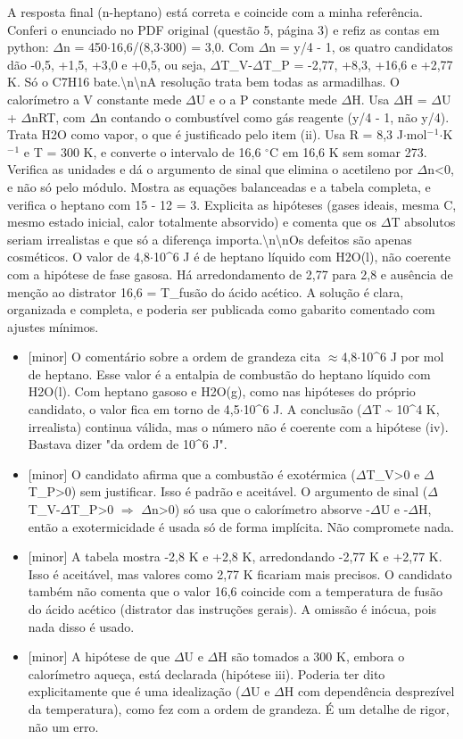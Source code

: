 \documentclass{article}%
\begin{document}
A resposta final (n{-}heptano) está correta e coincide com a minha referência. Conferi o enunciado no PDF original (questão 5, página 3) e refiz as contas em python: $\Delta$n = 450$\cdot$16,6/(8,3$\cdot$300) = 3,0. Com $\Delta$n = y/4 - 1, os quatro candidatos dão -0,5, +1,5, +3,0 e +0,5, ou seja, $\Delta$T\_V-$\Delta$T\_P = -2,77, +8,3, +16,6 e +2,77 K. Só o C7H16 bate.\textbackslash{}n\textbackslash{}nA resolução trata bem todas as armadilhas. O calorímetro a V constante mede $\Delta$U e o a P constante mede $\Delta$H. Usa $\Delta$H = $\Delta$U + $\Delta$nRT, com $\Delta$n contando o combustível como gás reagente (y/4 - 1, não y/4). Trata H2O como vapor, o que é justificado pelo item (ii). Usa R = 8,3 J$\cdot$mol$^{-}$$^{1}$$\cdot$K$^{-}$$^{1}$ e T = 300 K, e converte o intervalo de 16,6 $^\circ$C em 16,6 K sem somar 273. Verifica as unidades e dá o argumento de sinal que elimina o acetileno por $\Delta$n<0, e não só pelo módulo. Mostra as equações balanceadas e a tabela completa, e verifica o heptano com 15 - 12 = 3. Explicita as hipóteses (gases ideais, mesma C, mesmo estado inicial, calor totalmente absorvido) e comenta que os $\Delta$T absolutos seriam irrealistas e que só a diferença importa.\textbackslash{}n\textbackslash{}nOs defeitos são apenas cosméticos. O valor de 4,8$\cdot$10\^{}6 J é de heptano líquido com H2O(l), não coerente com a hipótese de fase gasosa. Há arredondamento de 2,77 para 2,8 e ausência de menção ao distrator 16,6 = T\_fusão do ácido acético. A solução é clara, organizada e completa, e poderia ser publicada como gabarito comentado com ajustes mínimos.%
\begin{itemize}%
\item%
{[}minor{]} O comentário sobre a ordem de grandeza cita $\approx$4,8$\cdot$10\^{}6 J por mol de heptano. Esse valor é a entalpia de combustão do heptano líquido com H2O(l). Com heptano gasoso e H2O(g), como nas hipóteses do próprio candidato, o valor fica em torno de 4,5$\cdot$10\^{}6 J. A conclusão ($\Delta$T \textasciitilde{} 10\^{}4 K, irrealista) continua válida, mas o número não é coerente com a hipótese (iv). Bastava dizer "da ordem de 10\^{}6 J".%
\item%
{[}minor{]} O candidato afirma que a combustão é exotérmica ($\Delta$T\_V>0 e $\Delta$T\_P>0) sem justificar. Isso é padrão e aceitável. O argumento de sinal ($\Delta$T\_V-$\Delta$T\_P>0 $\Rightarrow$ $\Delta$n>0) só usa que o calorímetro absorve -$\Delta$U e -$\Delta$H, então a exotermicidade é usada só de forma implícita. Não compromete nada.%
\item%
{[}minor{]} A tabela mostra -2,8 K e +2,8 K, arredondando -2,77 K e +2,77 K. Isso é aceitável, mas valores como 2,77 K ficariam mais precisos. O candidato também não comenta que o valor 16,6 coincide com a temperatura de fusão do ácido acético (distrator das instruções gerais). A omissão é inócua, pois nada disso é usado.%
\item%
{[}minor{]} A hipótese de que $\Delta$U e $\Delta$H são tomados a 300 K, embora o calorímetro aqueça, está declarada (hipótese iii). Poderia ter dito explicitamente que é uma idealização ($\Delta$U e $\Delta$H com dependência desprezível da temperatura), como fez com a ordem de grandeza. É um detalhe de rigor, não um erro.%
\end{itemize}%
\end{document}
